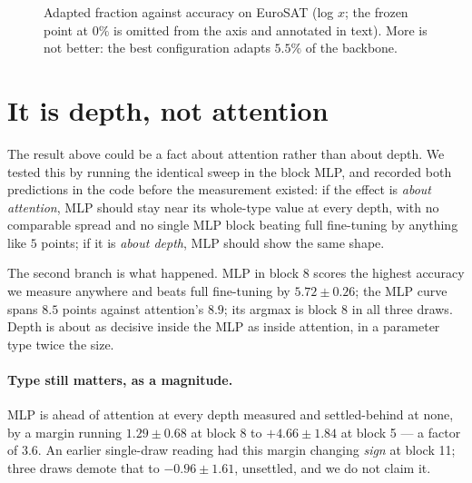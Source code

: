 \documentclass[11pt]{article}
\newcommand{\dd}[2]{$#1 \pm #2$}
\begin{document}
\begin{figure}[t]
\centering
{}
\caption{Adapted fraction against accuracy on EuroSAT (log $x$; the frozen point at
$0\%$ is omitted from the axis and annotated in text). More is not better: the best
configuration adapts $5.5\%$ of the backbone.}
\label{fig:params}
\end{figure}

\section{It is depth, not attention}
\label{sec:mlp}

The result above could be a fact about attention rather than about depth. We tested this
by running the identical sweep in the block MLP, and recorded both predictions in the
code before the measurement existed: if the effect is \emph{about attention}, MLP should
stay near its whole-type value at every depth, with no comparable spread and no single
MLP block beating full fine-tuning by anything like $5$ points; if it is \emph{about
depth}, MLP should show the same shape.

The second branch is what happened. MLP in block 8 scores the highest accuracy we
measure anywhere and beats full fine-tuning by \dd{5.72}{0.26}; the MLP curve spans
$8.5$ points against attention's $8.9$; its argmax is block 8 in all three draws.
Depth is about as decisive inside the MLP as inside attention, in a parameter type
twice the size.

\paragraph{Type still matters, as a magnitude.} MLP is ahead of attention at every
depth measured and settled-behind at none, by a margin running \dd{1.29}{0.68} at
block 8 to $+4.66 \pm 1.84$ at block 5 --- a factor of $3.6$. An earlier single-draw
reading had this margin changing \emph{sign} at block 11; three draws demote that to
$-0.96 \pm 1.61$, unsettled, and we do not claim it.
\end{document}

